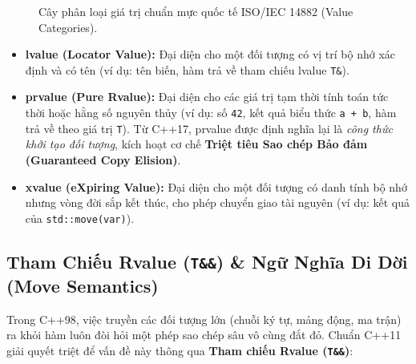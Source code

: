 \documentclass[12pt,a4paper,oneside]{book}
\begin{document}
\begin{figure}[htbp]
{%
}
\caption{Cây phân loại giá trị chuẩn mực quốc tế ISO/IEC 14882 (Value Categories).}
\end{figure}

\begin{itemize}
    \item \textbf{lvalue (Locator Value):} Đại diện cho một đối tượng có vị trí bộ nhớ xác định và có tên (ví dụ: tên biến, hàm trả về tham chiếu lvalue \texttt{T\&}).
    \item \textbf{prvalue (Pure Rvalue):} Đại diện cho các giá trị tạm thời tính toán tức thời hoặc hằng số nguyên thủy (ví dụ: số \texttt{42}, kết quả biểu thức \texttt{a + b}, hàm trả về theo giá trị \texttt{T}). Từ C++17, prvalue được định nghĩa lại là \textit{công thức khởi tạo đối tượng}, kích hoạt cơ chế \textbf{Triệt tiêu Sao chép Bảo đảm (Guaranteed Copy Elision)}.
    \item \textbf{xvalue (eXpiring Value):} Đại diện cho một đối tượng có danh tính bộ nhớ nhưng vòng đời sắp kết thúc, cho phép chuyển giao tài nguyên (ví dụ: kết quả của \texttt{std::move(var)}).
\end{itemize}

\subsection{Tham Chiếu Rvalue (\texttt{T\&\&}) \& Ngữ Nghĩa Di Dời (Move Semantics)}

Trong C++98, việc truyền các đối tượng lớn (chuỗi ký tự, mảng động, ma trận) ra khỏi hàm luôn đòi hỏi một phép sao chép sâu vô cùng đắt đỏ. Chuẩn C++11 giải quyết triệt để vấn đề này thông qua \textbf{Tham chiếu Rvalue (\texttt{T\&\&})}:
\end{document}
